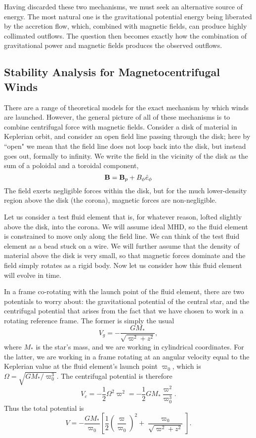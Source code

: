Having discarded these two mechanisms, we must seek an alternative source of energy. The most natural one is the gravitational potential energy being liberated by the accretion flow, which, combined with magnetic fields, can produce highly collimated outflows. The question then becomes exactly how the combination of gravitational power and magnetic fields produces the observed outflows.

\subsection{Stability Analysis for Magnetocentrifugal Winds}

There are a range of theoretical models for the exact mechanism by which winds are launched. However, the general picture of all of these mechanisms is to combine centrifugal force with magnetic fields. Consider a disk of material in Keplerian orbit, and consider an open field line passing through the disk; here by ``open" we mean that the field line does not loop back into the disk, but instead goes out, formally to infinity. We write the field in the vicinity of the disk as the sum of a poloidal and a toroidal component,
\begin{equation}
\mathbf{B} = \mathbf{B}_p + B_\phi \hat{e}_\phi
\end{equation}
The field exerts negligible forces within the disk, but for the much lower-density region above the disk (the corona), magnetic forces are non-negligible.

Let us consider a test fluid element that is, for whatever reason, lofted slightly above the disk, into the corona. We will assume ideal MHD, so the fluid element is constrained to move only along the field line. We can think of the test fluid element as a bead stuck on a wire. We will further assume that the density of material above the disk is very small, so that magnetic forces dominate and the field simply rotates as a rigid body. Now let us consider how this fluid element will evolve in time.

In a frame co-rotating with the launch point of the fluid element, there are two potentials to worry about: the gravitational potential of the central star, and the centrifugal potential that arises from the fact that we have chosen to work in a rotating reference frame. The former is simply the usual
\begin{equation}
V_{g} = -\frac{GM_*}{\sqrt{\varpi^2 + z^2}},
\end{equation}
where $M_*$ is the star's mass, and we are working in cylindrical coordinates. For the latter, we are working in a frame rotating at an angular velocity equal to the Keplerian value at the fluid element's launch point $\varpi_0$, which is $\Omega = \sqrt{GM_*/\varpi_0^3}$. The centrifugal potential is therefore
\begin{equation}
V_c = -\frac{1}{2}\Omega^2 \varpi^2 = -\frac{1}{2} G M_* \frac{\varpi^2}{\varpi_0^3}.
\end{equation}
Thus the total potential is
\begin{equation}
V = -\frac{GM_*}{\varpi_0} \left[\frac{1}{2}\left(\frac{\varpi}{\varpi_0}\right)^2 + \frac{\varpi_0}{\sqrt{\varpi^2+z^2}} \right].
\end{equation}

